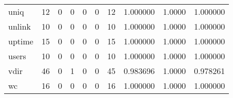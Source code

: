 \begin{longtable}{lrrrrrrrrr}
uniq      &                                       12 &                                                  0 &                                                  0 &                                                  0 &                                                  0 &                                                 12 &                                           1.000000 &                                 1.0000 &                             1.000000 \\
unlink    &                                       10 &                                                  0 &                                                  0 &                                                  0 &                                                  0 &                                                 10 &                                           1.000000 &                                 1.0000 &                             1.000000 \\
uptime    &                                       15 &                                                  0 &                                                  0 &                                                  0 &                                                  0 &                                                 15 &                                           1.000000 &                                 1.0000 &                             1.000000 \\
users     &                                       10 &                                                  0 &                                                  0 &                                                  0 &                                                  0 &                                                 10 &                                           1.000000 &                                 1.0000 &                             1.000000 \\
vdir      &                                       46 &                                                  0 &                                                  1 &                                                  0 &                                                  0 &                                                 45 &                                           0.983696 &                                 1.0000 &                             0.978261 \\
wc        &                                       16 &                                                  0 &                                                  0 &                                                  0 &                                                  0 &                                                 16 &                                           1.000000 &                                 1.0000 &                             1.000000 \\

\end{longtable}
